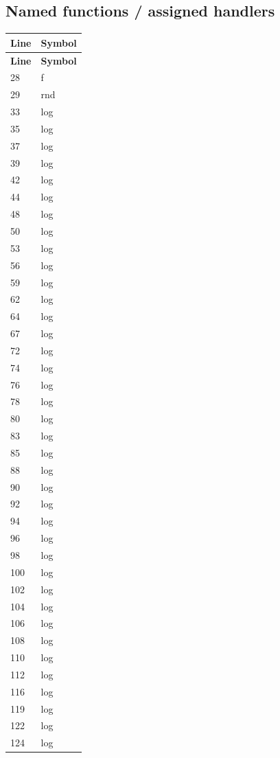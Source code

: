 \subsection{Named functions /\allowbreak{} assigned handlers}
\begin{longtable}{p{}p{}}
\toprule
\textbf{Line} & \textbf{Symbol} \\ \midrule
\endfirsthead
\textbf{Line} & \textbf{Symbol} \\ \midrule
\endhead
28 & f \\
29 & rnd \\
33 & log \\
35 & log \\
37 & log \\
39 & log \\
42 & log \\
44 & log \\
48 & log \\
50 & log \\
53 & log \\
56 & log \\
59 & log \\
62 & log \\
64 & log \\
67 & log \\
72 & log \\
74 & log \\
76 & log \\
78 & log \\
80 & log \\
83 & log \\
85 & log \\
88 & log \\
90 & log \\
92 & log \\
94 & log \\
96 & log \\
98 & log \\
100 & log \\
102 & log \\
104 & log \\
106 & log \\
108 & log \\
110 & log \\
112 & log \\
116 & log \\
119 & log \\
122 & log \\
124 & log \\

\end{longtable}
